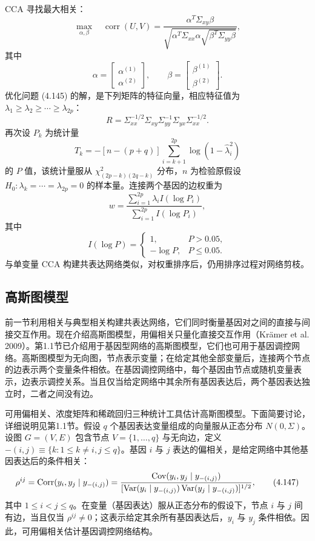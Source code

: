 CCA 寻找最大相关：
\begin{equation}
\max_{\alpha,\beta}\quad\operatorname{corr}(U,V)
=\frac{\alpha^T\Sigma_{xy}\beta}{\sqrt{\alpha^T\Sigma_{xx}\alpha\sqrt{\beta^T\Sigma_{yy}\beta}}},
\tag{4.145}
\end{equation}
其中
\[
\alpha=\begin{bmatrix}\alpha^{(1)}\\\alpha^{(2)}\end{bmatrix},\qquad
\beta=\begin{bmatrix}\beta^{(1)}\\\beta^{(2)}\end{bmatrix}.
\]
优化问题 (4.145) 的解，是下列矩阵的特征向量，相应特征值为 $\lambda_1\ge\lambda_2\ge\cdots\ge\lambda_{2p}$：
\[
R=\Sigma_{xx}^{-1/2}\Sigma_{xy}\Sigma_{yy}^{-1}\Sigma_{yx}\Sigma_{xx}^{-1/2}.
\]
再次设 $P_k$ 为统计量
\[
T_k=-[n-(p+q)]\sum_{i=k+1}^{2p}\log(1-\hat\lambda_i^2)
\]
的 $P$ 值，该统计量服从 $\chi^2_{(2p-k)(2q-k)}$ 分布，$n$ 为检验原假设 $H_0:\lambda_k=\cdots=\lambda_{2p}=0$ 的样本量。连接两个基因的边权重为
\begin{equation}
w=\frac{\sum_{i=1}^{2p}\lambda_iI(\log P_i)}{\sum_{i=1}^{2p}I(\log P_i)},
\tag{4.146}
\end{equation}
其中
\[
I(\log P)=\begin{cases}1,&P>0.05,\\-\log P,&P\le0.05.\end{cases}
\]
与单变量 CCA 构建共表达网络类似，对权重排序后，仍用排序过程对网络剪枝。

\subsection{高斯图模型}
前一节利用相关与典型相关构建共表达网络，它们同时衡量基因对之间的直接与间接交互作用。现在介绍高斯图模型，用偏相关只量化直接交互作用（Krämer et al. 2009）。第1.1节已介绍用于基因型网络的高斯图模型，它们也可用于基因调控网络。高斯图模型为无向图，节点表示变量；在给定其他全部变量后，连接两个节点的边表示两个变量条件相依。在基因调控网络中，每个基因由节点或随机变量表示，边表示调控关系。当且仅当给定网络中其余所有基因表达后，两个基因表达独立时，二者之间没有边。

可用偏相关、浓度矩阵和稀疏回归三种统计工具估计高斯图模型。下面简要讨论，详细说明见第1.1节。假设 $q$ 个基因表达变量组成的向量服从正态分布 $N(0,\Sigma)$。设图 $G=(V,E)$ 包含节点 $V=\{1,\ldots,q\}$ 与无向边，定义 $-(i,j)\equiv\{k:1\le k\ne i,j\le q\}$。基因 $i$ 与 $j$ 表达的偏相关，是给定网络中其他基因表达后的条件相关：
\begin{equation}
\rho^{ij}=\operatorname{Corr}(y_i,y_j\mid y_{-(i,j)})
=\frac{\operatorname{Cov}(y_i,y_j\mid y_{-(i,j)})}
{[\operatorname{Var}(y_i\mid y_{-(i,j)})\operatorname{Var}(y_j\mid y_{-(i,j)})]^{1/2}},
\tag{4.147}
\end{equation}
其中 $1\le i<j\le q$。在变量（基因表达）服从正态分布的假设下，节点 $i$ 与 $j$ 间有边，当且仅当 $\rho^{ij}\ne0$；这表示给定其余所有基因表达后，$y_i$ 与 $y_j$ 条件相依。因此，可用偏相关估计基因调控网络结构。

